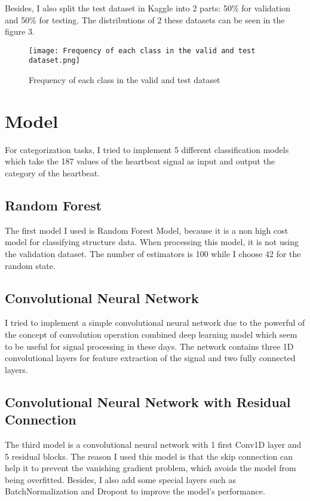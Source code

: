 \documentclass{article}
\begin{document}
\noindent Besides, I also split the test dataset in Kaggle into 2 parts: 50\% for validation and 50\% for testing.
The distributions of 2 these datasets can be seen in the figure 3. \\
\begin{figure}[h]
\centering
\texttt{[image: Frequency of each class in the valid and test dataset.png]}
\caption{Frequency of each class in the valid and test dataset}
\end{figure}
    

\section{Model}
For categorization tasks, I tried to implement 5 different classification models which 
take the 187 values of the heartbeat signal as input and output the category of the heartbeat.
\subsection{Random Forest}
The first model I used is Random Forest Model,
because it is a non high cost model for classifying structure data. 
When processing this model, it is not using the validation dataset.
The number of estimators is 100 while I choose 42 for the random state.


\subsection{Convolutional Neural Network}
I tried to implement a simple convolutional neural network due to 
the powerful of the concept of convolution operation combined deep learning model which seem to be
useful for signal processing in these days. The network contains three 1D convolutional layers 
for feature extraction of the signal and two fully connected layers.

\subsection{Convolutional Neural Network with Residual Connection}
The third model is a convolutional neural network with 1 first Conv1D layer and 5 residual blocks. 
The reason I used this model is that the skip connection can help it to prevent the vanishing gradient 
problem, which avoids the model from being overfitted. Besides, I also add some special layers such as
BatchNormalization and Dropout to improve the model's performance.
\end{document}
